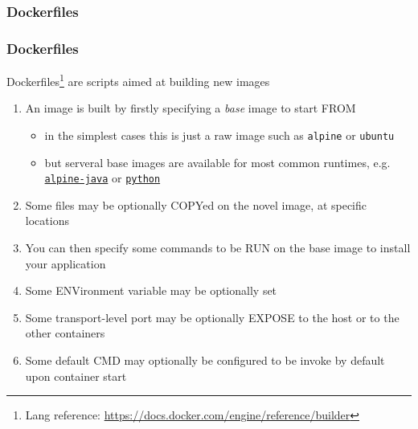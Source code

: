 \documentclass{beamer}\mode<presentation>{\usetheme{AMSBolognaFC}}
\begin{document}
\begin{frame}[allowframebreaks]
\begin{enumerate}
    \end{enumerate}

\end{frame}

\subsubsection{Dockerfiles}

\begin{frame}%
\frametitle{Dockerfiles}

    Dockerfiles\footnote{Lang reference: \url{https://docs.docker.com/engine/reference/builder}} are scripts aimed at \alert{building} new images
    \begin{enumerate}
        \item An image is built by firstly specifying a \emph{base} image to start \alert{FROM}
        \begin{itemize}
            \item in the simplest cases this is just a raw image such as \texttt{alpine} or \texttt{ubuntu}
            \item but serveral base images are available for most common runtimes, e.g. \href{https://hub.docker.com/r/anapsix/alpine-java/}{\texttt{alpine-java}} or \href{https://hub.docker.com/_/python/}{\texttt{python}}
        \end{itemize}
        \item Some files may be optionally \alert{COPY}ed on the novel image, at specific locations
        \item You can then specify some commands to be \alert{RUN} on the base image to install your application
        \item Some \alert{ENV}ironment variable may be optionally set
        \item Some transport-level port may be optionally \alert{EXPOSE} to the host or to the other containers
        \item Some default \alert{CMD} may optionally be configured to be invoke by default upon container start

    \end{enumerate}

\end{frame}
\end{document}
